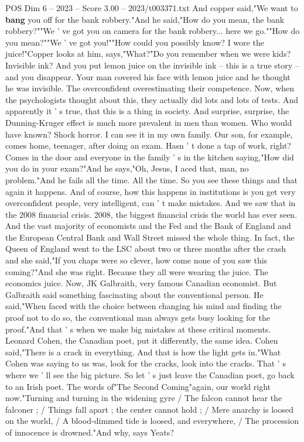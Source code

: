 \begin{textsample}{POS Dim 6 – 2023 – Score 3.00 – 2023/t003371.txt}
And copper said,"We want to \textbf{bang} you off for the bank robbery."And he said,"How do you mean, the bank robbery?""We ' ve got you on camera for the bank robbery... here we go.""How do you mean?""We ' ve got you!""How could you possibly know?
I wore the juice!"Copper looks at him, says,"What?"Do you remember when we were kids?
Invisible ink?
And you put lemon juice on the invisible ink -- this is a true story -- and you disappear.
Your man covered his face with lemon juice and he thought he was invisible.
The overconfident overestimating their competence.
Now, when the psychologists thought about this, they actually did lots and lots of tests.
And apparently it ' s true, that this is a thing in society.
And surprise, surprise, the Dunning-Kruger effect is much more prevalent in men than women.
Who would have known?
Shock horror.
I can see it in my own family.
Our son, for example, comes home, teenager, after doing an exam.
Hasn ' t done a tap of work, right?
Comes in the door and everyone in the family ' s in the kitchen saying,"How did you do in your exam?"And he says,"Oh, Jesus, I aced that, man, no problem."And he fails all the time.
All the time.
So you see these things and that again it happens.
And of course, how this happens in institutions is you get very overconfident people, very intelligent, can ' t make mistakes.
And we saw that in the 2008 financial crisis. 2008, the biggest financial crisis the world has ever seen.
And the vast majority of economists and the Fed and the Bank of England and the European Central Bank and Wall Street missed the whole thing.
In fact, the Queen of England went to the LSC about two or three months after the crash and she said,"If you chaps were so clever, how come none of you saw this coming?"And she was right.
Because they all were wearing the juice.
The economics juice.
Now, JK Galbraith, very famous Canadian economist.
But Galbraith said something fascinating about the conventional person.
He said,"When faced with the choice between changing his mind and finding the proof not to do so, the conventional man always gets busy looking for the proof."And that ' s when we make big mistakes at these critical moments.
Leonard Cohen, the Canadian poet, put it differently, the same idea.
Cohen said,"There is a crack in everything.
And that is how the light gets in."What Cohen was saying to us was, look for the cracks, look into the cracks.
That ' s where we ' ll see the big picture.
So let ' s just leave the Canadian poet, go back to an Irish poet.
The words of"The Second Coming"again, our world right now."Turning and turning in the widening gyre / The falcon cannot hear the falconer ; / Things fall apart ; the center cannot hold ; / Mere anarchy is loosed on the world, / A blood-dimmed tide is loosed, and everywhere, / The procession of innocence is drowned."And why, says Yeats?

\end{textsample}
